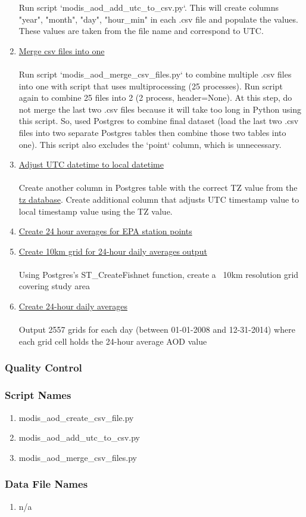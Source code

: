 \begin{enumerate}
Run script `modis\_aod\_add\_utc\_to\_csv.py`. This will create columns "year", "month", "day", "hour\_min" in each .csv file and populate the values. These values are taken from the file name and correspond to UTC.
\item \underline{Merge csv files into one}\\\\
Run script `modis\_aod\_merge\_csv\_files.py` to combine multiple .csv files into one with script that uses multiprocessing (25 processes). Run script again to combine 25 files into 2 (2 process, header=None). At this step, do not merge the last two .csv files because it will take too long in Python using this script. So, used Postgres to combine final dataset (load the last two .csv files into two separate Postgres tables then combine those two tables into one). This script also excludes the `point` column, which is unnecessary. 
\item \underline{Adjust UTC datetime to local datetime}\\\\
Create another column in Postgres table with the correct TZ value from the \href{https://en.wikipedia.org/wiki/List_of_tz_database_time_zones}{tz database}. Create additional column that adjusts UTC timestamp value to local timestamp value using the TZ value.
\item \underline{Create 24 hour averages for EPA station points}
\item \underline{Create 10km grid for 24-hour daily averages output}\\\\
Using Postgres's ST\_CreateFishnet function, create a ~10km resolution grid covering study area
\item \underline{Create 24-hour daily averages}\\\\
Output 2557 grids for each day (between 01-01-2008 and 12-31-2014) where each grid cell holds the 24-hour average AOD value 

\end{enumerate}

\subsubsection*{Quality Control}

\subsubsection*{Script Names}

\begin{enumerate}
\item modis\_aod\_create\_csv\_file.py
\item modis\_aod\_add\_utc\_to\_csv.py
\item modis\_aod\_merge\_csv\_files.py
\end{enumerate}

\subsubsection*{Data File Names}

\begin{enumerate}
\item n/a
\end{enumerate}
